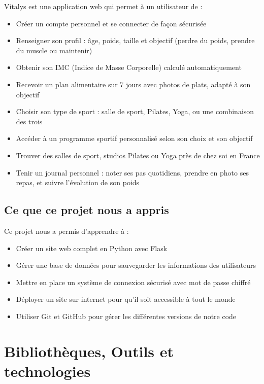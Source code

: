 \documentclass[a4paper, 12pt, twoside]{article}
\begin{document}
Vitalys est une application web qui permet à un utilisateur de :
\begin{itemize}
    \item Créer un compte personnel et se connecter de façon sécurisée
    \item Renseigner son profil : âge, poids, taille et objectif (perdre du poids, prendre du muscle ou maintenir)
    \item Obtenir son IMC (Indice de Masse Corporelle) calculé automatiquement
    \item Recevoir un plan alimentaire sur 7 jours avec photos de plats, adapté à son objectif
    \item Choisir son type de sport : salle de sport, Pilates, Yoga, ou une combinaison des trois
    \item Accéder à un programme sportif personnalisé selon son choix et son objectif
    \item Trouver des salles de sport, studios Pilates ou Yoga près de chez soi en France
    \item Tenir un journal personnel : noter ses pas quotidiens, prendre en photo ses repas, et suivre l'évolution de son poids
\end{itemize}

\subsection{Ce que ce projet nous a appris}

Ce projet nous a permis d'apprendre à :
\begin{itemize}
    \item Créer un site web complet en Python avec Flask
    \item Gérer une base de données pour sauvegarder les informations des utilisateurs
    \item Mettre en place un système de connexion sécurisé avec mot de passe chiffré
    \item Déployer un site sur internet pour qu'il soit accessible à tout le monde
    \item Utiliser Git et GitHub pour gérer les différentes versions de notre code
\end{itemize}

\section{Bibliothèques, Outils et technologies}
\end{document}
